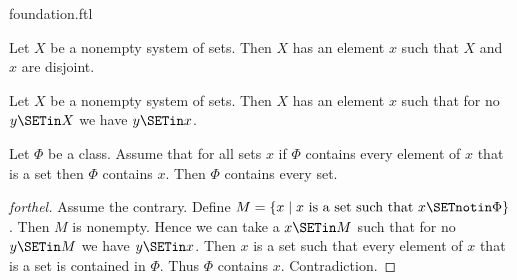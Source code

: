 \documentclass{stex}
\begin{document}
\begin{smodule}{foundation.ftl}

\begin{axiom}[forthel,title=Foundation,id=FOUNDATIONS_10_1320008569323520]
  Let $X$ be a nonempty system of sets.
  Then $X$ has an element $x$ such that $X$ and $x$ are disjoint.
\end{axiom}

\begin{corollary}[forthel,id=FOUNDATIONS_10_9532145874510315]
  Let $X$ be a nonempty system of sets.
  Then $X$ has an element $x$ such that for no $y \SETin X$ we have $y \SETin x$.
\end{corollary}

\begin{proposition}[forthel,id=FOUNDATIONS_11_2812087589928960]
  Let $\Phi$ be a class.
  Assume that for all sets $x$ if $\Phi$ contains every element of $x$ that is a set then $\Phi$ contains $x$.
  Then $\Phi$ contains every set.
\end{proposition}
\begin{proof}[forthel]
  Assume the contrary.
  Define $M = \{ x \mid x\text{ is a set such that }x \SETnotin \Phi \}$.
  Then $M$ is nonempty.
  Hence we can take a $x \SETin M$ such that for no $y \SETin M$ we have $y \SETin x$.
  Then $x$ is a set such that every element of $x$ that is a set is contained in $\Phi$.
  Thus $\Phi$ contains $x$.
  Contradiction.
\end{proof}
\end{smodule}
\end{document}

